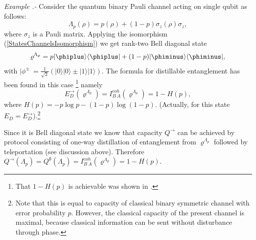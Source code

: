 \documentclass[twocolumn,aps,rmp]{revtex4}
\begin{document}
{\it Example .- } Consider the quantum binary Pauli channel
acting on single qubit as follows:
\begin{equation}
\Lambda_{p}(\rho)=p(\rho) + (1-p)\sigma_{z}(\rho)\sigma_{z},
\end{equation}
where $\sigma_{z}$ is a Pauli matrix.
Applying the isomorphism (\ref{StatesChannelsIsomorphism}) we get
rank-two Bell diagonal state
\begin{equation}
\varrho^{\Lambda_{p}}=p|\phiplus\rangle\langle\phiplus|
+(1-p)|\phiminus\rangle\langle\phiminus|,
\end{equation}
with $|\phi^{\pm}\>=\frac{1}{\sqrt{2}}(|0\rangle|0\rangle \pm
|1\rangle|1\rangle)$. The formula for distillable entanglement has
been found in this case \cite{Rains1999,Rains-erratum1999}
\footnote{That $1-H(p)$ is achievable
was shown in \cite{BDSW1996}.} namely
\begin{equation}
E_{D}^{\rightarrow}(\varrho^{\Lambda_{p}})=I^{coh}_{B\>A}(\varrho^{\Lambda_{p}})=1-H(p),
\label{Rains}
\end{equation}
 where $H(p)=-p \log p-(1-p)\log (1-p)$. (Actually, for this state $E_D=E_D^{\rightarrow}$).\footnote{Note that this is equal to capacity of classical
 binary symmetric channel with error probability $p$. However,
 the classical capacity of the present channel is maximal,
 because classical information can be sent without disturbance through phase.}

Since it is
Bell diagonal state we know that capacity $Q^{\rightarrow}$
can be achieved by protocol consisting of one-way distillation of
entanglement from $\varrho^{\Lambda_{p}}$ followed by teleportation
(see discussion above). Therefore
$Q^{ \rightarrow }(\Lambda_{p})=Q^{ \emptyset
}(\Lambda_{p})=I^{coh}_{B\>A}(\varrho^{\Lambda_{p}})=1-H(p)$.
\end{document}
